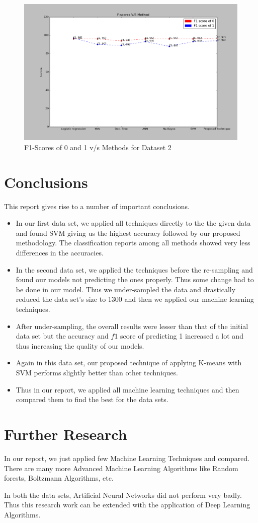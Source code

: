 \begin{figure}
  \centering
  \includegraphics[scale=.45]{i3.png}
  \caption{F1-Scores of 0 and 1 v/s Methods for Dataset 2}
  
\end{figure}

\section{Conclusions}

This report gives rise to a number of important conclusions.
\begin{itemize}
\item In our first data set, we applied all techniques directly to the the given data and found SVM giving us the highest accuracy followed by our proposed methodology. The classification reports among all methods showed very less differences in the accuracies.
\item In the second data set, we applied the techniques before the re-sampling and found our models not predicting the ones properly. Thus some change had to be done in our model. Thus we under-sampled the data and drastically reduced the data set's size to 1300 and then we applied our machine learning techniques.
\item After under-sampling, the overall results were lesser than that of the initial data set but the accuracy and $f1$ score of predicting 1 increased a lot and thus increasing the quality of our models.
\item Again in this data set, our proposed technique of applying K-means with SVM performs slightly better than other techniques.
\item Thus in our report, we applied all machine learning techniques and then compared them to find the best for the data sets.
\end{itemize}

\section{Further Research}
   In our report, we just applied few Machine Learning Techniques and compared. There are many more Advanced Machine Learning Algorithms like Random forests, Boltzmann Algorithms, etc.
   \par In both the data sets, Artificial Neural Networks did not perform very badly. Thus this research work can be extended with the application of Deep Learning Algorithms.
   